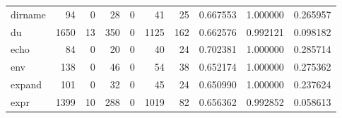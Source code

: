 \begin{tabular}{lrrrrrrrrr}
dirname   &                                                 94 &                                                  0 &                                                 28 &                                                  0 &                                                 41 &                                                 25 &                                           0.667553 &                               1.000000 &                             0.265957 \\
du        &                                               1650 &                                                 13 &                                                350 &                                                  0 &                                               1125 &                                                162 &                                           0.662576 &                               0.992121 &                             0.098182 \\
echo      &                                                 84 &                                                  0 &                                                 20 &                                                  0 &                                                 40 &                                                 24 &                                           0.702381 &                               1.000000 &                             0.285714 \\
env       &                                                138 &                                                  0 &                                                 46 &                                                  0 &                                                 54 &                                                 38 &                                           0.652174 &                               1.000000 &                             0.275362 \\
expand    &                                                101 &                                                  0 &                                                 32 &                                                  0 &                                                 45 &                                                 24 &                                           0.650990 &                               1.000000 &                             0.237624 \\
expr      &                                               1399 &                                                 10 &                                                288 &                                                  0 &                                               1019 &                                                 82 &                                           0.656362 &                               0.992852 &                             0.058613 \\

\end{tabular}
